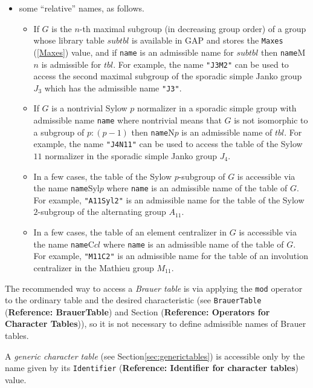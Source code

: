 \documentclass[a4paper,11pt]{report}
\begin{document}
{{{\begin{itemize}
 (But note that the ordering of rows and columns of the \textsf{GAP} table may be different from that in \textsf{CAS}, see Section{\nobreakspace}\ref{sec:CAS Tables}.) 
\item  some ``relative'' names, as follows. 
\begin{itemize}
\item  If $G$ is the $n$-th maximal subgroup (in decreasing group order) of a group whose library
table $subtbl$ is available in \textsf{GAP} and stores the \texttt{Maxes} (\ref{Maxes}) value, and if \texttt{name} is an admissible name for $subtbl$ then \texttt{name}M$n$ is admissible for $tbl$. For example, the name \texttt{"J3M2"} can be used to access the second maximal subgroup of the sporadic simple Janko
group $J_3$ which has the admissible name \texttt{"J3"}. 
\item  If $G$ is a nontrivial Sylow $p$ normalizer in a sporadic simple group with admissible name \texttt{name} {\textendash}where nontrivial means that $G$ is not isomorphic to a subgroup of $p:(p-1)${\textendash} then \texttt{name}N$p$ is an admissible name of $tbl$. For example, the name \texttt{"J4N11"} can be used to access the table of the Sylow $11$ normalizer in the sporadic simple Janko group $J_4$. 
\item  In a few cases, the table of the Sylow $p$-subgroup of $G$ is accessible via the name \texttt{name}Syl$p$ where \texttt{name} is an admissible name of the table of $G$. For example, \texttt{"A11Syl2"} is an admissible name for the table of the Sylow $2$-subgroup of the alternating group $A_{11}$. 
\item  In a few cases, the table of an element centralizer in $G$ is accessible via the name \texttt{name}C$cl$ where \texttt{name} is an admissible name of the table of $G$. For example, \texttt{"M11C2"} is an admissible name for the table of an involution centralizer in the
Mathieu group $M_{11}$. 
\end{itemize}
 
\end{itemize}
 

 The recommended way to access a \emph{Brauer table} is via applying the \texttt{mod} operator to the ordinary table and the desired characteristic (see \texttt{BrauerTable} (\textbf{Reference: BrauerTable}) and Section{\nobreakspace} (\textbf{Reference: Operators for Character Tables})), so it is not necessary to define admissible names of Brauer tables. 

 A \emph{generic character table} (see Section{\nobreakspace}\ref{sec:generictables}) is accessible only by the name given by its \texttt{Identifier} (\textbf{Reference: Identifier for character tables}) value. }

}}
\end{document}
